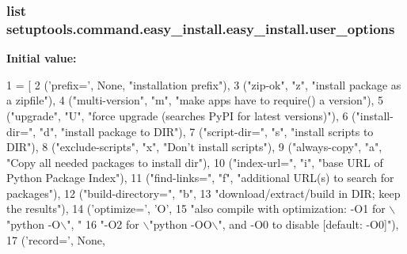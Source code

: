 \subsubsection[{user\+\_\+options}]{\setlength{\rightskip}{0pt plus 5cm}list setuptools.\+command.\+easy\+\_\+install.\+easy\+\_\+install.\+user\+\_\+options\hspace{0.3cm}{\ttfamily [static]}}\label{classsetuptools_1_1command_1_1easy__install_1_1easy__install_a0b3f110c5afd8ba998ae1bcadf434b83}
{\bfseries Initial value\+:}
\begin{DoxyCode}
1 = [
2         (\textcolor{stringliteral}{'prefix='}, \textcolor{keywordtype}{None}, \textcolor{stringliteral}{"installation prefix"}),
3         (\textcolor{stringliteral}{"zip-ok"}, \textcolor{stringliteral}{"z"}, \textcolor{stringliteral}{"install package as a zipfile"}),
4         (\textcolor{stringliteral}{"multi-version"}, \textcolor{stringliteral}{"m"}, \textcolor{stringliteral}{"make apps have to require() a version"}),
5         (\textcolor{stringliteral}{"upgrade"}, \textcolor{stringliteral}{"}\textcolor{stringliteral}{U", "}force upgrade (searches PyPI for latest versions)"),
6         (\textcolor{stringliteral}{"install-dir="}, \textcolor{stringliteral}{"d"}, \textcolor{stringliteral}{"install package to DIR"}),
7         (\textcolor{stringliteral}{"script-dir="}, \textcolor{stringliteral}{"s"}, \textcolor{stringliteral}{"install scripts to DIR"}),
8         (\textcolor{stringliteral}{"exclude-scripts"}, \textcolor{stringliteral}{"x"}, \textcolor{stringliteral}{"Don't install scripts"}),
9         (\textcolor{stringliteral}{"always-copy"}, \textcolor{stringliteral}{"a"}, \textcolor{stringliteral}{"Copy all needed packages to install dir"}),
10         (\textcolor{stringliteral}{"index-url="}, \textcolor{stringliteral}{"i"}, \textcolor{stringliteral}{"base URL of Python Package Index"}),
11         (\textcolor{stringliteral}{"find-links="}, \textcolor{stringliteral}{"f"}, \textcolor{stringliteral}{"additional URL(s) to search for packages"}),
12         (\textcolor{stringliteral}{"build-directory="}, \textcolor{stringliteral}{"b"},
13          \textcolor{stringliteral}{"download/extract/build in DIR; keep the results"}),
14         (\textcolor{stringliteral}{'optimize='}, \textcolor{stringliteral}{'O'},
15          \textcolor{stringliteral}{"also compile with optimization: -O1 for \(\backslash\)"python -O\(\backslash\)", "}
16          \textcolor{stringliteral}{"-O2 for \(\backslash\)"python -OO\(\backslash\)", and -O0 to disable [default: -O0]"}),
17         (\textcolor{stringliteral}{'record='}, \textcolor{keywordtype}{None},

\end{DoxyCode}
